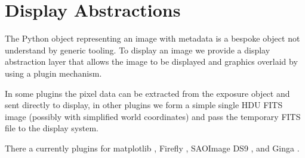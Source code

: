 \section{Display Abstractions}
\label{sec:display}

The Python object representing an image with metadata is a bespoke object not understand by generic tooling.
To display an image we provide a display abstraction layer that allows the image to be displayed and graphics overlaid by using a plugin mechanism.

In some plugins the pixel data can be extracted from the exposure object and sent directly to display, in other plugins we form a simple single HDU FITS image (possibly with simplified world coordinates) and pass the temporary FITS file to the display system.

There a currently plugins for matplotlib \citep{2007CSE.....9...90H}, Firefly \citep{2020ASPC..527..243R}, SAOImage DS9 \citep{2003ASPC..295..489J}, and Ginga \citep[][via Astrowidgets]{2013ASPC..475..319J}.
